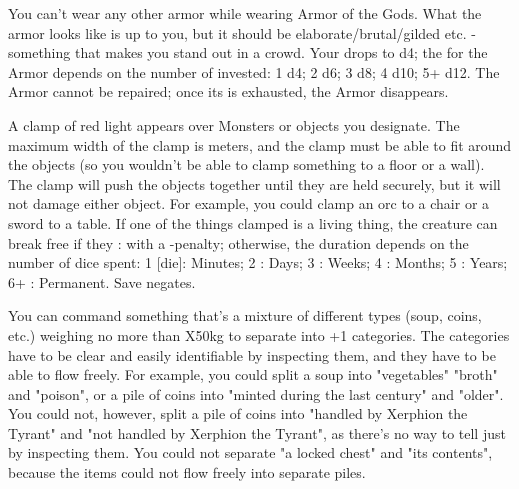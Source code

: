 


\MYSTERY [
  Name = Armor of the Gods,
  Link = arcana-mystery-armor-of-the-gods,
  Paradigm = Force,
  Save = N,
  Duration = Session,
  Target = Self
]

You can't wear any other armor while wearing Armor of the Gods.  What the armor looks like is up to you, but it should be elaborate/brutal/gilded etc. - something that makes you stand out in a crowd.  Your \MD drops to d4; the \UD for the Armor depends on the number of \DICE invested: 1 d4; 2 d6; 3 d8; 4 d10; 5+ d12.  The Armor cannot be repaired; once its \UD is exhausted, the Armor disappears.


\MYSTERY [
  Name = Clamp,
  Link = arcana-mystery-clamp,
  Paradigm = Force,
  Save = Y (neg.),
  Duration = varies,
  Target = Nearby Target(s)
]

A clamp of red light appears over \DICE Monsters or objects you designate. The maximum width of the clamp is \DICE meters, and the clamp must be able to fit around the objects (so you wouldn't be able to clamp something to a floor or a wall).  The clamp will push the objects together until they are held securely, but it will not damage either object.  For example, you could clamp an orc to a chair or a sword to a table.  If one of the things clamped is a living thing, the creature can break free if they \RB : \VIG with a -\DICE penalty; otherwise, the duration depends on the number of dice spent:  1 [die]: Minutes; 2 \DICE: Days; 3 \DICE: Weeks; 4 \DICE: Months; 5 \DICE: Years; 6+ \DICE: Permanent.  Save negates.


\MYSTERY [
  Name = Divvy,
  Link = arcana-mystery-divvy,
  Paradigm = Entropy,
  Save = N,
  Duration = Permanent,
  Target = Close Target(s)
]

You can command something that's a mixture of different types (soup, coins, etc.) weighing no more than \DICE X50kg to separate into \DICE+1 categories.  The categories have to be clear and easily identifiable by inspecting them, and they have to be able to flow freely.  For example, you could split a soup into "vegetables" "broth" and "poison", or a pile of coins into "minted during the last century" and "older". You could not, however, split a pile of coins into "handled by Xerphion the Tyrant" and "not handled by Xerphion the Tyrant", as there's no way to tell just by inspecting them. You could not separate "a locked chest" and "its contents", because the items could not flow freely into separate piles.


